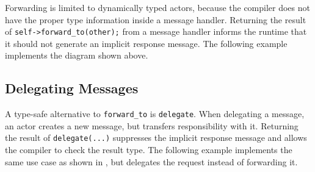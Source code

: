 Forwarding is limited to dynamically typed actors, because the compiler does not have the proper type information inside a message handler. Returning the result of \lstinline^self->forward_to(other);^ from a message handler informs the runtime that it should not generate an implicit response message. The following example implements the diagram shown above.

\clearpage
%

\clearpage
\subsection{Delegating Messages}
\label{delegate}

A type-safe alternative to \lstinline^forward_to^ is \lstinline^delegate^.
When delegating a message, an actor creates a new message, but transfers responsibility with it.
Returning the result of \lstinline^delegate(...)^ suppresses the implicit response message and allows the compiler to check the result type.
The following example implements the same use case as shown in , but delegates the request instead of forwarding it.


